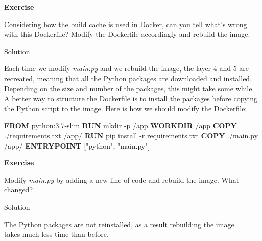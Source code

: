 \documentclass[
]{article}
\newenvironment{Shaded}{\begin{snugshade}}{\end{snugshade}}
\newcommand{\KeywordTok}[1]{\textcolor[rgb]{0.13,0.29,0.53}{\textbf{#1}}}
\newcommand{\NormalTok}[1]{#1}
\newcommand{\StringTok}[1]{\textcolor[rgb]{0.31,0.60,0.02}{#1}}
\newenvironment{infobox}[1]
  {
  \begin{itemize}
  \renewcommand{\labelitemi}{
    \raisebox{-.7\height}[0pt][0pt]{
      
    }
  }
  \setlength{\fboxsep}{1em}
  \begin{whitebox}
  \item
  }
  {
  \end{whitebox}
  \end{itemize}
  }
\theoremstyle{definition}
\theoremstyle{definition}
\theoremstyle{definition}
\theoremstyle{remark}
\let\BeginKnitrBlock\begin \let\EndKnitrBlock\end
\begin{document}
\begin{infobox}{exercisebox}

\textbf{Exercise}

\BeginKnitrBlock{exercise}
\protect\hypertarget{exr:unnamed-chunk-23}{}{\label{exr:unnamed-chunk-23} }Considering how the build cache is used in Docker,
can you tell what's wrong with this Dockerfile?
Modify the Dockerfile accordingly and rebuild the image.
\EndKnitrBlock{exercise}

\end{infobox}

Solution

\begin{infobox}{exercisebox}

Each time we modify \emph{main.py} and we rebuild the image,
the layer 4 and 5 are recreated, meaning that all the Python packages
are downloaded and installed.
Depending on the size and number of the packages, this might
take some while.
A better way to structure the Dockerfile is to install the
packages before copying the Python script to the image.
Here is how we should modify the Dockerfile:

\begin{Shaded}
\begin{Highlighting}[]
\KeywordTok{FROM}\NormalTok{ python:3.7{-}slim}
\KeywordTok{RUN}\NormalTok{ mkdir {-}p /app}
\KeywordTok{WORKDIR}\NormalTok{ /app}
\KeywordTok{COPY}\NormalTok{ ./requirements.txt /app/}
\KeywordTok{RUN}\NormalTok{ pip install {-}r requirements.txt}
\KeywordTok{COPY}\NormalTok{ ./main.py /app/}
\KeywordTok{ENTRYPOINT}\NormalTok{ [}\StringTok{"python"}\NormalTok{, }\StringTok{"main.py"}\NormalTok{]}
\end{Highlighting}
\end{Shaded}

\end{infobox}

\begin{infobox}{exercisebox}

\textbf{Exercise}

\BeginKnitrBlock{exercise}
\protect\hypertarget{exr:unnamed-chunk-24}{}{\label{exr:unnamed-chunk-24} }Modify \emph{main.py} by adding a new line of code and rebuild the image.
What changed?
\EndKnitrBlock{exercise}

\end{infobox}

Solution

\begin{infobox}{exercisebox}

The Python packages are not reinstalled, as a result rebuilding the image\\
takes much less time than before.

\end{infobox}
\end{document}
